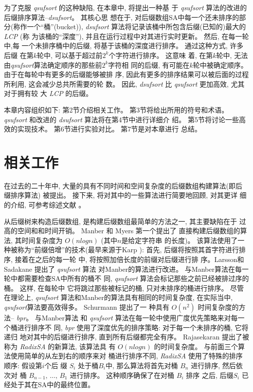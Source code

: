 为了克服 \emph{qsufsort} 的这种缺陷, 在本章中, 将提出一种基
于 \emph{qsufsort} 算法的改进的后缀排序算法--\emph{dsufsort}。 其核心思
想在于, 对后缀数组SA中每一个还未排序的部分(称作一个“桶”(bucket)),
\emph{dsufsort} 算法将记录该桶中所包含后缀(已知的)最大的\emph{LCP} (称
为该桶的“深度”), 并且在运行过程中对其进行实时更新。 然后, 在每一轮中,每
一个未排序桶中的后缀, 将基于该桶的深度进行排序。 通过这种方式, 许多后缀
在第$k$轮中, 可以基于超过前$2^k$个字符进行排序。 这意味
着, 在第$k$轮中, 无法由\emph{qsufsort}算法确定顺序的那些前$2^{k}$字符相
同的后缀, 有可能在$k$轮中被确定顺序。 由于在每轮中有更多的后缀能够被排
序, 因此有更多的排序结果可以被后面的过程所利用, 这会减少总共所需要的轮
数。 因此, \emph{dsufsort} 比 \emph{qsufsort} 更加高效, 尤其对于拥有较
大 \emph{LCP} 的后缀。

本章内容组织如下: 第2节介绍相关工作。 第3节将给出所用的符号和术语。
\emph{qsufsort} 和改进的 \emph{dsufsort} 算法将在第4节中进行详细介
绍。 第5节将讨论一些高效的实现技术。 第6节进行实验对比。 第7节是对本章进行
总结。

\section{相关工作}

在过去的二十年中, 大量的具有不同时间和空间复杂度的后缀数组构建算法(即后
缀排序算法) 被提出。 接下来, 将对其中的一些算法进行简要地回顾, 对其更详
细的介绍, 可参考综述文献 \cite{Puglisi2007} \cite{Dhaliwal2012}。

从后缀树来构造后缀数组, 是构建后缀数组最简单的方法之一, 其主要缺陷在于
过高的空间和和时间开销。 Manber 和 Myers \cite{Manber1993} 第一个提出了
直接构建后缀数组的算法, 其时间复杂度为 $O(nlogn)$ (其中$n$是给定字符串
的长度)。 该算法使用了一种被称为“前缀倍增”的技术(最早来源于Karp
\cite{Karp1972}): 首先, 后缀将按照其首字符进行排序, 接着在之后的每一轮
中, 将按照加倍长度的前缀对后缀进行排
序。Larsson和Sadakane\cite{Larsson2007} 提出了 \emph{qsufsort} 算法
对Manber的算法进行改进。 与Manber算法在每一轮中都需要检查SA中所有的桶不
同, \emph{qsufsort} 算法会标记那些之前已经被排过序的桶。 这样, 在每轮中
它将跳过那些被标记的桶, 只对未排序的桶进行排序。 尽管在理论上,
\emph{qsufsort} 算法和Manber的算法具有相同的时间复杂度, 在实际当中,
\emph{qsufsort}算法要高效得多。 Schurmann\cite{Schurmann2007} 提出了一
种具有 $O(n^2)$ 时间复杂度的方法-- \emph{bpr}。 与Manber算法
和 \emph{qsufsort} 算法在每一轮中使用广度优先策略来对每一个桶进行排序不
同, \emph{bpr} 使用了深度优先的排序策略: 对于每一个未排序的桶, 它将递归
地对其中的后缀进行排序, 直到所有后缀都完全有序。  Rajasekaran
\cite{Rajasekaran2014} 提出了被称为 \emph{RadixSA} 的新算法, 该算法具
有 $O(nlogn)$ 的时间复杂度。 与前面三个算法使用简单的从左到右的顺序来对
桶进行排序不同, \emph{RadixSA} 使用了特殊的排序顺序: 假设第$i$个后
缀 $S_i$ 处于桶$B_i$中, 那么算法将首先对桶 $B_n$ 进行排序, 然后依次对
桶 $B_{n-1},\,\dots,\, B_1$ 进行排序。 这种顺序确保了在对桶 $B_i$ 排序
之后, 后缀$S_i$ 已经处于其在SA中的最终位置。


